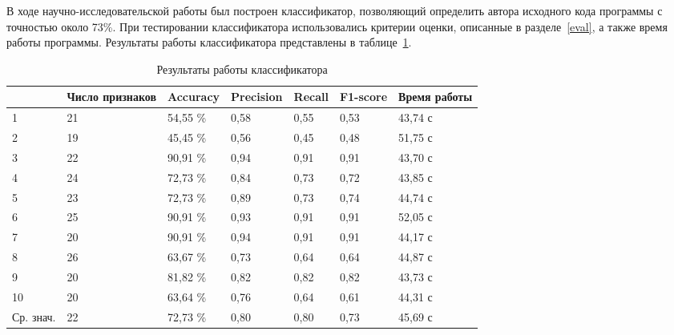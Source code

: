 В ходе научно-исследовательской работы был построен классификатор, позволяющий определить автора исходного кода программы с точностью около 73\%. При тестировании классификатора использовались критерии оценки, описанные в разделе~\ref{eval}, а также время работы программы. Результаты работы классификатора представлены в таблице~\ref{tab:5}.

\begin{table}[h!]
\caption{ Результаты работы классификатора }
\label{tab:5}
\begin{center}
\begin{tabularx}{\linewidth}{|X|X|X|X|X|X|X|}
\hline
  & Число признаков & Accuracy & Precision & Recall & F1-score & Время работы\\
\hline
1 & 21 & 54,55 \% & 0,58 & 0,55 & 0,53 & 43,74 с\\
\hline
2 & 19 & 45,45 \% & 0,56 & 0,45 & 0,48 & 51,75 с\\
\hline
3 & 22 & 90,91 \% & 0,94 & 0,91 & 0,91 & 43,70 с\\
\hline
4 & 24 & 72,73 \% & 0,84 & 0,73 & 0,72 & 43,85 с\\
\hline
5 & 23 & 72,73 \% & 0,89 & 0,73 & 0,74 & 44,74 с\\
\hline
6 & 25 & 90,91 \% & 0,93 & 0,91 & 0,91 & 52,05 с\\
\hline
7 & 20 & 90,91 \% & 0,94 & 0,91 & 0,91 & 44,17 с\\
\hline
8 & 26 & 63,67 \% & 0,73 & 0,64 & 0,64 & 44,87 с\\
\hline
9 & 20 & 81,82 \% & 0,82 & 0,82 & 0,82 & 43,73 с\\
\hline
10 & 20 & 63,64 \% & 0,76 & 0,64 & 0,61 & 44,31 с\\
\hline
Ср. знач. & 22 & 72,73 \% & 0,80 & 0,80 & 0,73 & 45,69 с\\
\hline
\end{tabularx}
\end{center}
\end{table}
